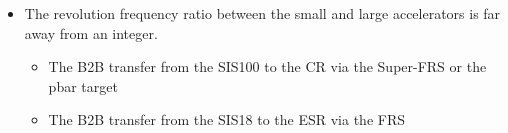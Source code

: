 \begin{itemize}

 	\item The revolution frequency ratio between the small and large accelerators is far away from an integer.
		\begin{itemize}
			\item The B2B transfer from the SIS100 to the CR via the Super-FRS or the pbar target
			\item The B2B transfer from the SIS18 to the ESR via the FRS
		\end{itemize}
\end{itemize}
  

